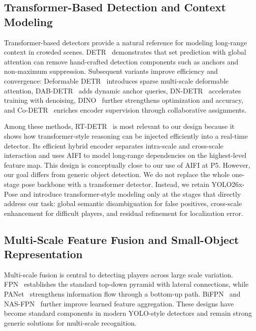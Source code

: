 \subsection{Transformer-Based Detection and Context Modeling}
\label{subsec:transformer}

Transformer-based detectors provide a natural reference for modeling long-range context in crowded scenes. DETR~\cite{carion2020end} demonstrates that set prediction with global attention can remove hand-crafted detection components such as anchors and non-maximum suppression. Subsequent variants improve efficiency and convergence: Deformable DETR~\cite{zhu2021deformable} introduces sparse multi-scale deformable attention, DAB-DETR~\cite{liu2022dabdetr} adds dynamic anchor queries, DN-DETR~\cite{li2022dn} accelerates training with denoising, DINO~\cite{zhang2023dino} further strengthens optimization and accuracy, and Co-DETR~\cite{zong2023detrs} enriches encoder supervision through collaborative assignments.

Among these methods, RT-DETR~\cite{zhao2024detrs} is most relevant to our design because it shows how transformer-style reasoning can be injected efficiently into a real-time detector. Its efficient hybrid encoder separates intra-scale and cross-scale interaction and uses AIFI to model long-range dependencies on the highest-level feature map. This design is conceptually close to our use of AIFI at P5. However, our goal differs from generic object detection. We do not replace the whole one-stage pose backbone with a transformer detector. Instead, we retain YOLO26x-Pose and introduce transformer-style modeling only at the stages that directly address our task: global semantic disambiguation for false positives, cross-scale enhancement for difficult players, and residual refinement for localization error.

\subsection{Multi-Scale Feature Fusion and Small-Object Representation}
\label{subsec:multiscale}

Multi-scale fusion is central to detecting players across large scale variation. FPN~\cite{lin2017feature} establishes the standard top-down pyramid with lateral connections, while PANet~\cite{liu2018path} strengthens information flow through a bottom-up path. BiFPN~\cite{tan2020efficientdet} and NAS-FPN~\cite{ghiasi2019nasfpn} further improve learned feature aggregation. These designs have become standard components in modern YOLO-style detectors and remain strong generic solutions for multi-scale recognition.

